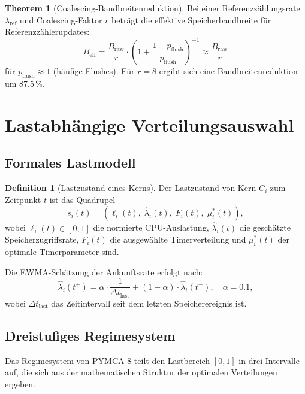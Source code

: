 ﻿\documentclass[a4paper,12pt]{scrreprt}
\theoremstyle{definition}
\newtheorem{definition}{Definition}[section]
\newtheorem{theorem}{Theorem}[section]
\begin{document}
	\begin{theorem}[Coalescing-Bandbreitenreduktion]
		\label{thm:coalescing}
		Bei einer Referenzzählungsrate $\lambda_{\mathrm{ref}}$ und
		Coalescing-Faktor $r$ beträgt die effektive Speicherbandbreite für
		Referenzzählerupdates:
		\[
		B_{\mathrm{eff}} = \frac{B_{\mathrm{raw}}}{r} \cdot
		\left(1 + \frac{1-p_{\mathrm{flush}}}{p_{\mathrm{flush}}}\right)^{-1}
		\approx \frac{B_{\mathrm{raw}}}{r}
		\]
		für $p_{\mathrm{flush}} \approx 1$ (häufige Flushes). Für $r=8$ ergibt
		sich eine Bandbreitenreduktion um 87.5\,\%.
	\end{theorem}
	
	\section{Lastabhängige Verteilungsauswahl}
	
	\subsection{Formales Lastmodell}
	
	\begin{definition}[Lastzustand eines Kerns]
		\label{def:load}
		Der Lastzustand von Kern $C_i$ zum Zeitpunkt $t$ ist das Quadrupel
		\[
		s_i(t) = \left(\ell_i(t),\; \hat\lambda_i(t),\; F_i(t),\; \mu_i^*(t)\right),
		\]
		wobei $\ell_i(t) \in [0,1]$ die normierte CPU-Auslastung,
		$\hat\lambda_i(t)$ die geschätzte Speicherzugriffsrate,
		$F_i(t)$ die ausgewählte Timerverteilung und
		$\mu_i^*(t)$ der optimale Timerparameter sind.
	\end{definition}
	
	Die EWMA-Schätzung der Ankunftsrate erfolgt nach:
	\begin{equation}
		\hat\lambda_i(t^+) = \alpha \cdot \frac{1}{\Delta t_{\mathrm{last}}}
		+ (1-\alpha) \cdot \hat\lambda_i(t^-),
		\quad \alpha = 0.1,
		\label{eq:ewma}
	\end{equation}
	wobei $\Delta t_{\mathrm{last}}$ das Zeitintervall seit dem letzten
	Speicherereignis ist.
	
	\subsection{Dreistufiges Regimesystem}
	
	Das Regimesystem von PYMCA-8 teilt den Lastbereich $[0,1]$ in drei
	Intervalle auf, die sich aus der mathematischen Struktur der optimalen
	Verteilungen ergeben.
	
\end{document}
